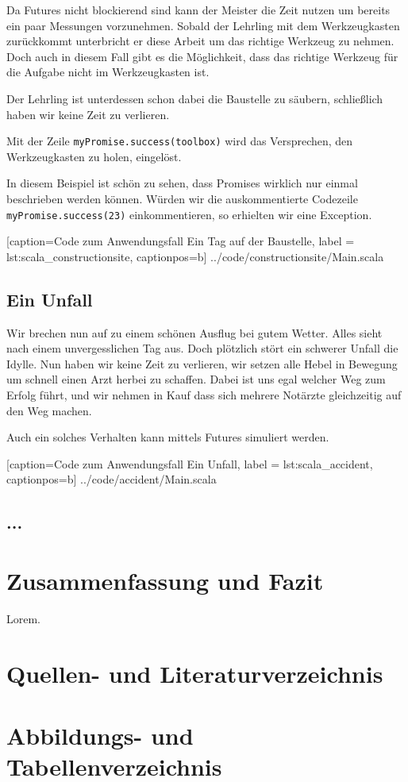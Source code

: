 \documentclass[11pt,a4paper,titlepage,ngerman]{scrartcl}
\begin{document}
Da Futures nicht blockierend sind kann der Meister die Zeit nutzen um bereits
ein paar Messungen vorzunehmen. Sobald der Lehrling mit dem Werkzeugkasten
zurückkommt unterbricht er diese Arbeit um das richtige Werkzeug zu nehmen.
Doch auch in diesem Fall gibt es die Möglichkeit, dass das richtige Werkzeug
für die Aufgabe nicht im Werkzeugkasten ist.

Der Lehrling ist unterdessen schon dabei die Baustelle zu säubern, schließlich
haben wir keine Zeit zu verlieren.

Mit der Zeile \texttt{myPromise.success(toolbox)} wird das Versprechen,
den Werkzeugkasten zu holen, eingelöst.

In diesem Beispiel ist schön zu sehen, dass Promises wirklich nur einmal
beschrieben werden können. Würden wir die auskommentierte Codezeile
\texttt{myPromise.success(23)} einkommentieren, so erhielten wir eine
Exception.


    [caption={Code zum Anwendungsfall \glqq Ein Tag auf der Baustelle\grqq },
       label = lst:scala_constructionsite,
       captionpos=b]
 {../code/constructionsite/Main.scala}

\subsection{Ein Unfall}

Wir brechen nun auf zu einem schönen Ausflug bei gutem Wetter. Alles sieht
nach einem unvergesslichen Tag aus. Doch plötzlich stört ein schwerer Unfall
die Idylle. Nun haben wir keine Zeit zu verlieren, wir setzen alle Hebel in
Bewegung um schnell einen Arzt herbei zu schaffen. Dabei ist uns egal welcher
Weg zum Erfolg führt, und wir nehmen in Kauf dass sich mehrere Notärzte gleichzeitig
auf den Weg machen.

Auch ein solches Verhalten kann mittels Futures simuliert werden.


    [caption={Code zum Anwendungsfall \glqq Ein Unfall\grqq },
       label = lst:scala_accident,
       captionpos=b]
 {../code/accident/Main.scala}

\subsection{...}

\newpage
\section{Zusammenfassung und Fazit}

Lorem.

\newpage

\section{Quellen- und Literaturverzeichnis}




\section{Abbildungs- und Tabellenverzeichnis}

\renewcommand{\listfigurename}{Verzeichnis der Abbildungen}
\listoffigures

\newpage

\printglossary
\end{document}
